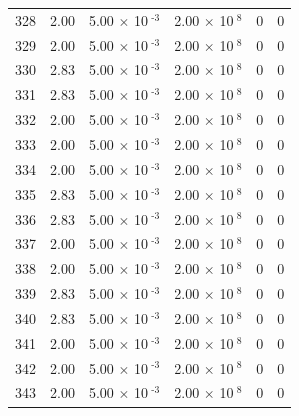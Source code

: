 \documentclass[a4paper,11pt]{article}
\begin{document}
\begin{center}
\begin{longtable}{|R{1.5cm}|R{2.4cm}|R{2.4cm}|R{2.4cm}|R{2.4cm}|R{2.4cm}|}
  328 &   2.00  &         5.00 $\times$ 10$^{\text{          -3}}$  &         2.00 $\times$ 10$^{\text{           8}}$  & 0  & 0 \\
  329 &   2.00  &         5.00 $\times$ 10$^{\text{          -3}}$  &         2.00 $\times$ 10$^{\text{           8}}$  & 0  & 0 \\
  330 &   2.83  &         5.00 $\times$ 10$^{\text{          -3}}$  &         2.00 $\times$ 10$^{\text{           8}}$  & 0  & 0 \\
  331 &   2.83  &         5.00 $\times$ 10$^{\text{          -3}}$  &         2.00 $\times$ 10$^{\text{           8}}$  & 0  & 0 \\
  332 &   2.00  &         5.00 $\times$ 10$^{\text{          -3}}$  &         2.00 $\times$ 10$^{\text{           8}}$  & 0  & 0 \\
  333 &   2.00  &         5.00 $\times$ 10$^{\text{          -3}}$  &         2.00 $\times$ 10$^{\text{           8}}$  & 0  & 0 \\
  334 &   2.00  &         5.00 $\times$ 10$^{\text{          -3}}$  &         2.00 $\times$ 10$^{\text{           8}}$  & 0  & 0 \\
  335 &   2.83  &         5.00 $\times$ 10$^{\text{          -3}}$  &         2.00 $\times$ 10$^{\text{           8}}$  & 0  & 0 \\
  336 &   2.83  &         5.00 $\times$ 10$^{\text{          -3}}$  &         2.00 $\times$ 10$^{\text{           8}}$  & 0  & 0 \\
  337 &   2.00  &         5.00 $\times$ 10$^{\text{          -3}}$  &         2.00 $\times$ 10$^{\text{           8}}$  & 0  & 0 \\
  338 &   2.00  &         5.00 $\times$ 10$^{\text{          -3}}$  &         2.00 $\times$ 10$^{\text{           8}}$  & 0  & 0 \\
  339 &   2.83  &         5.00 $\times$ 10$^{\text{          -3}}$  &         2.00 $\times$ 10$^{\text{           8}}$  & 0  & 0 \\
  340 &   2.83  &         5.00 $\times$ 10$^{\text{          -3}}$  &         2.00 $\times$ 10$^{\text{           8}}$  & 0  & 0 \\
  341 &   2.00  &         5.00 $\times$ 10$^{\text{          -3}}$  &         2.00 $\times$ 10$^{\text{           8}}$  & 0  & 0 \\
  342 &   2.00  &         5.00 $\times$ 10$^{\text{          -3}}$  &         2.00 $\times$ 10$^{\text{           8}}$  & 0  & 0 \\
  343 &   2.00  &         5.00 $\times$ 10$^{\text{          -3}}$  &         2.00 $\times$ 10$^{\text{           8}}$  & 0  & 0 \\

\end{longtable}
\end{center}
\end{document}
